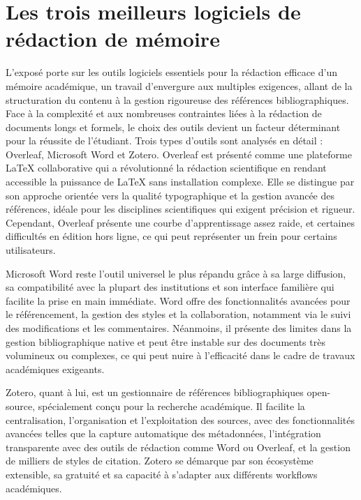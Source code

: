 \documentclass[11pt,a4paper]{article}
\begin{document}
	\section{Les trois meilleurs logiciels de rédaction de mémoire}
	\vspace{0.5cm}
	L’exposé porte sur les outils logiciels essentiels pour la rédaction efficace d’un mémoire académique, un travail d’envergure aux multiples exigences, allant de la structuration du contenu à la gestion rigoureuse des références bibliographiques. Face à la complexité et aux nombreuses contraintes liées à la rédaction de documents longs et formels, le choix des outils devient un facteur déterminant pour la réussite de l’étudiant. Trois types d’outils sont analysés en détail : Overleaf, Microsoft Word et Zotero. Overleaf est présenté comme une plateforme LaTeX collaborative qui a révolutionné la rédaction scientifique en rendant accessible la puissance de LaTeX sans installation complexe. Elle se distingue par son approche orientée vers la qualité typographique et la gestion avancée des références, idéale pour les disciplines scientifiques qui exigent précision et rigueur. Cependant, Overleaf présente une courbe d’apprentissage assez raide, et certaines difficultés en édition hors ligne, ce qui peut représenter un frein pour certains utilisateurs.
	
	Microsoft Word reste l’outil universel le plus répandu grâce à sa large diffusion, sa compatibilité avec la plupart des institutions et son interface familière qui facilite la prise en main immédiate. Word offre des fonctionnalités avancées pour le référencement, la gestion des styles et la collaboration, notamment via le suivi des modifications et les commentaires. Néanmoins, il présente des limites dans la gestion bibliographique native et peut être instable sur des documents très volumineux ou complexes, ce qui peut nuire à l’efficacité dans le cadre de travaux académiques exigeants.
	
	Zotero, quant à lui, est un gestionnaire de références bibliographiques open-source, spécialement conçu pour la recherche académique. Il facilite la centralisation, l’organisation et l’exploitation des sources, avec des fonctionnalités avancées telles que la capture automatique des métadonnées, l’intégration transparente avec des outils de rédaction comme Word ou Overleaf, et la gestion de milliers de styles de citation. Zotero se démarque par son écosystème extensible, sa gratuité et sa capacité à s’adapter aux différents workflows académiques.
	
\end{document}

